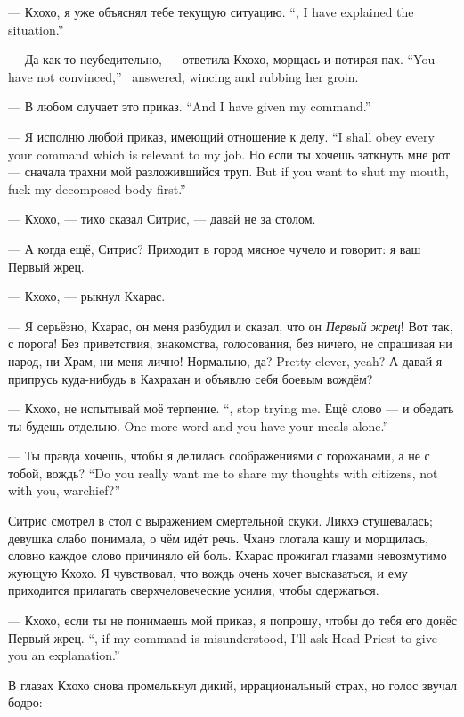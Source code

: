 {--- Кхохо, я уже объяснял тебе текущую ситуацию.}
{``\Kchoho, I have explained the situation.''}

{--- Да как-то неубедительно, --- ответила Кхохо, морщась и потирая пах.}
{``You have not convinced,'' \Kchoho\ answered, wincing and rubbing her groin.}

{--- В любом случает это приказ.}
{``And I have given my command.''}

{--- Я исполню любой приказ, имеющий отношение к делу.}
{``I shall obey every your command which is relevant to my job.}
{Но если ты хочешь заткнуть мне рот --- сначала трахни мой разложившийся труп.}
{But if you want to shut my mouth, fuck my decomposed body first.''}

--- Кхохо, --- тихо сказал Ситрис, --- давай не за столом.

--- А когда ещё, Ситрис?
Приходит в город мясное чучело и говорит: я ваш Первый жрец.

--- Кхохо, --- рыкнул Кхарас.

--- Я серьёзно, Кхарас, он меня разбудил и сказал, что он \emph{Первый жрец}!
Вот так, с порога!
Без приветствия, знакомства, голосования, без ничего, не спрашивая ни народ, ни Храм, ни меня лично!
{Нормально, да?}
{Pretty clever, yeah?}
А давай я припрусь куда-нибудь в Кахрахан и объявлю себя боевым вождём?

{--- Кхохо, не испытывай моё терпение.}
{``\Kchoho, stop trying me.}
{Ещё слово --- и обедать ты будешь отдельно.}
{One more word and you have your meals alone.''}

{--- Ты правда хочешь, чтобы я делилась соображениями с горожанами, а не с тобой, вождь?}
{``Do you really want me to share my thoughts with citizens, not with you, warchief?''}

Ситрис смотрел в стол с выражением смертельной скуки.
Ликхэ стушевалась;
девушка слабо понимала, о чём идёт речь.
Чханэ глотала кашу и морщилась, словно каждое слово причиняло ей боль.
Кхарас прожигал глазами невозмутимо жующую Кхохо.
Я чувствовал, что вождь очень хочет высказаться, и ему приходится прилагать сверхчеловеческие усилия, чтобы сдержаться.

{--- Кхохо, если ты не понимаешь мой приказ, я попрошу, чтобы до тебя его донёс Первый жрец.}
{``\Kchoho, if my command is misunderstood, I'll ask Head Priest to give you an explanation.''}

В глазах Кхохо снова промелькнул дикий, иррациональный страх, но голос звучал бодро:

